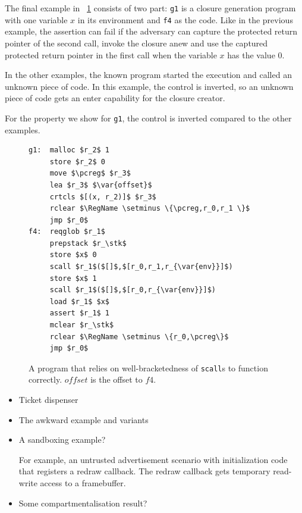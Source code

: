 \documentclass[compsoc,conference,letterpaper,fleqn]{IEEEtran}
\newcommand{\var}[1]{\mathit{#1}}
\newcommand{\pcreg}{\mathrm{pc}}
\newcommand{\stk}{\var{stk}}
\newcommand{\plaindom}[1]{\mathrm{#1}}
\newcommand{\RegName}{\plaindom{RegName}}
\begin{document}
The final example in \figurename~\ref{fig:prog-g1} consists of two
part: \texttt{g1} is a closure generation program with one variable $x$ in its
environment and \texttt{f4} as the code. Like in the previous example, the assertion can fail if the adversary can capture the protected return pointer of the second call, invoke the closure anew and use the captured protected return pointer in the first call when the variable $x$ has the value 0.

In the other examples, the known program started the execution and called an unknown piece of code. In this example, the control is inverted, so an unknown piece of code gets an enter capability for the closure creator.

For the property we show for \texttt{g1}, the control is inverted
compared to the other examples. 

\begin{figure}[htbp]
  \centering
  \begin{lstlisting}
g1:  malloc $r_2$ 1
     store $r_2$ 0
     move $\pcreg$ $r_3$
     lea $r_3$ $\var{offset}$
     crtcls $[(x, r_2)]$ $r_3$
     rclear $\RegName \setminus \{\pcreg,r_0,r_1 \}$
     jmp $r_0$
f4:  reqglob $r_1$
     prepstack $r_\stk$
     store $x$ 0
     scall $r_1$($[]$,$[r_0,r_1,r_{\var{env}}]$)
     store $x$ 1
     scall $r_1$($[]$,$[r_0,r_{\var{env}}]$)
     load $r_1$ $x$
     assert $r_1$ 1
     mclear $r_\stk$
     rclear $\RegName \setminus \{r_0,\pcreg\}$
     jmp $r_0$
\end{lstlisting}
  \caption{A program that relies on well-bracketedness of
    \texttt{scall}s to function correctly. $\var{offset}$ is the
    offset to $f4$.}
  \label{fig:prog-g1}
\end{figure}

\begin{itemize}
\item Ticket dispenser
\item The awkward example and variants
\item A sandboxing example?

For example, an untrusted advertisement scenario with initialization code
that registers a redraw callback. The redraw callback gets temporary
read-write access to a framebuffer.

\item Some compartmentalisation result?
\end{itemize}
\end{document}
